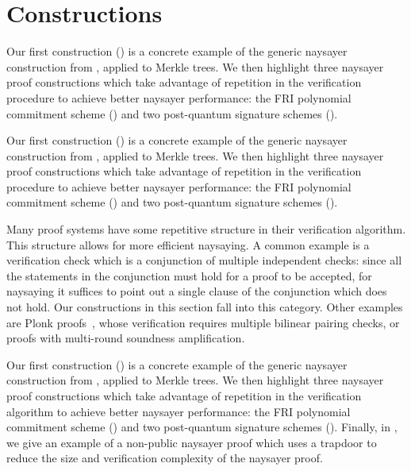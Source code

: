\section{Constructions}\label{sec:naysayer_apps}


Our first construction () is a concrete example of the generic naysayer construction from , applied to Merkle trees. 
We then highlight three naysayer proof constructions which take advantage of repetition in the verification procedure to achieve better naysayer performance: the FRI polynomial commitment scheme () and two post-quantum signature schemes (). 

 
Our first construction () is a concrete example of the generic naysayer construction from , applied to Merkle trees. 
We then highlight three naysayer proof constructions which take advantage of repetition in the verification procedure to achieve better naysayer performance: the FRI polynomial commitment scheme () and two post-quantum signature schemes (). 

Many proof systems have some repetitive structure in their verification algorithm. This structure allows for more efficient naysaying. A common example is a verification check which is a conjunction of multiple independent checks: since all the statements in the conjunction must hold for a proof to be accepted, for naysaying it suffices to point out a single clause of the conjunction which does not hold. Our constructions in this section fall into this category. Other examples are Plonk proofs~\cite{EPRINT:GabWilCio19}, whose verification requires multiple bilinear pairing checks, or proofs with multi-round soundness amplification.

Our first construction () is a concrete example of the generic naysayer construction from , applied to Merkle trees.
We then highlight three naysayer proof constructions which take advantage of repetition in the verification algorithm to achieve better naysayer performance: the FRI polynomial commitment scheme () and two post-quantum signature schemes (). 
Finally, in , we give an example of a non-public naysayer proof which uses a trapdoor to reduce the size and verification complexity of the naysayer proof. %

